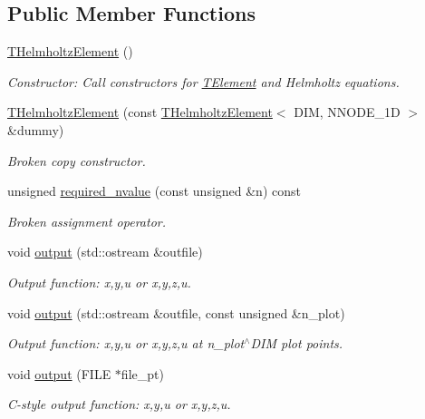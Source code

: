 \subsection*{Public Member Functions}
\begin{DoxyCompactItemize}
\item 
\hyperlink{classoomph_1_1THelmholtzElement_af122fd610721ab511e4cc62b48974ed3}{T\+Helmholtz\+Element} ()
\begin{DoxyCompactList}\small\item\em Constructor\+: Call constructors for \hyperlink{classoomph_1_1TElement}{T\+Element} and Helmholtz equations. \end{DoxyCompactList}\item 
\hyperlink{classoomph_1_1THelmholtzElement_ac7bc0fe535e267fbce26353c74d7f282}{T\+Helmholtz\+Element} (const \hyperlink{classoomph_1_1THelmholtzElement}{T\+Helmholtz\+Element}$<$ D\+IM, N\+N\+O\+D\+E\+\_\+1D $>$ \&dummy)
\begin{DoxyCompactList}\small\item\em Broken copy constructor. \end{DoxyCompactList}\item 
unsigned \hyperlink{classoomph_1_1THelmholtzElement_abec5553a409b17c2ca94b63848de6902}{required\+\_\+nvalue} (const unsigned \&n) const
\begin{DoxyCompactList}\small\item\em Broken assignment operator. \end{DoxyCompactList}\item 
void \hyperlink{classoomph_1_1THelmholtzElement_a563752a21a9e84091bd5c6c8c5a3e750}{output} (std\+::ostream \&outfile)
\begin{DoxyCompactList}\small\item\em Output function\+: x,y,u or x,y,z,u. \end{DoxyCompactList}\item 
void \hyperlink{classoomph_1_1THelmholtzElement_ad16215e9aac2518284b9e5a0b8b535d1}{output} (std\+::ostream \&outfile, const unsigned \&n\+\_\+plot)
\begin{DoxyCompactList}\small\item\em Output function\+: x,y,u or x,y,z,u at n\+\_\+plot$^\wedge$\+D\+IM plot points. \end{DoxyCompactList}\item 
void \hyperlink{classoomph_1_1THelmholtzElement_a43d1c573a4c51b9e146d5e9f767ea65c}{output} (F\+I\+LE $\ast$file\+\_\+pt)
\begin{DoxyCompactList}\small\item\em C-\/style output function\+: x,y,u or x,y,z,u. \end{DoxyCompactList}\item 

\end{DoxyCompactItemize}

